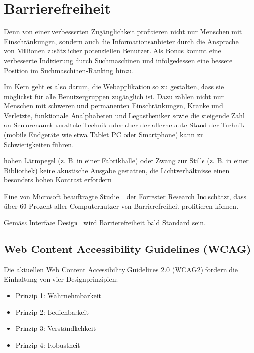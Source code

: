 \section{Barrierefreiheit}

Denn von einer verbesserten Zugänglichkeit profitieren nicht nur Menschen mit Einschränkungen, sondern auch die Informationsanbieter durch die Ansprache von Millionen zusätzlicher potenziellen Benutzer. Als Bonus kommt eine verbesserte Indizierung durch Suchmaschinen und infolgedessen eine bessere Position im Suchmaschinen-Ranking hinzu.

Im Kern geht es also darum, die Webapplikation so zu gestalten, dass sie möglichst für alle Benutzergruppen zugänglich ist. Dazu zählen nicht nur Menschen mit schweren und permanenten Einschränkungen, Kranke und Verletzte, funktionale Analphabeten und Legastheniker sowie die steigende Zahl an Seniorenauch veraltete Technik oder aber der allerneueste Stand der Technik (mobile Endgeräte wie etwa Tablet PC oder Smartphone) kann zu Schwierigkeiten führen.

hohen Lärmpegel (z. B. in einer Fabrikhalle) oder Zwang zur Stille (z. B. in einer Bibliothek) keine akustische Ausgabe gestatten, die Lichtverhältnisse einen besonders hohen Kontrast erfordern

Eine von Microsoft beauftragte Studie ~\cite{ForresterResearch2004E:Abilities} der \flqq Forrester Research Inc.\frqq schätzt, dass über 60 Prozent aller Computernutzer von Barrierefreiheit profitieren können. 


Gemäss \flqq Interface Design\frqq ~\cite{ThesmannStephan2016ID:U} wird Barrierefreiheit bald Standard sein.







\subsection{Web Content Accessibility Guidelines (WCAG)}

Die aktuellen Web Content Accessibility Guidelines 2.0 (WCAG2) fordern die Einhaltung von vier Designprinzipien:

\begin{itemize}  
\item Prinzip 1: Wahrnehmbarkeit 
\item Prinzip 2: Bedienbarkeit
\item Prinzip 3: Verständlichkeit
\item Prinzip 4: Robustheit
\end{itemize}

